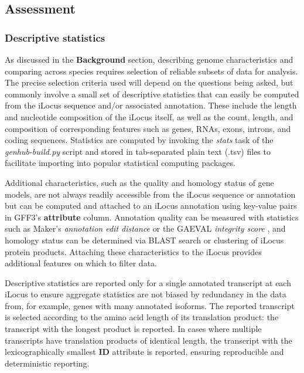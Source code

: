 \subsection*{Assessment}

\subsubsection*{Descriptive statistics}

As discussed in the \textbf{Background} section, describing genome characteristics and comparing across species requires selection of reliable subsets of data for analysis.
The precise selection criteria used will depend on the questions being asked, but commonly involve a small set of descriptive statistics that can easily be computed from the iLocus sequence and/or associated annotation.
These include the length and nucleotide composition of the iLocus itself, as well as the count, length, and composition of corresponding features such as genes, RNAs, exons, introns, and coding sequences.
Statistics are computed by invoking the \textit{stats} task of the \textit{genhub-build.py} script and stored in tab-separated plain text (.tsv) files to facilitate importing into popular statistical computing packages.

Additional characteristics, such as the quality and homology status of gene models, are not always readily accessible from the iLocus sequence or annotation but can be computed and attached to an iLocus annotation using key-value pairs in GFF3's \textbf{attribute} column.
Annotation quality can be measured with statistics such as Maker's \textit{annotation edit distance} \cite{AED} or the GAEVAL \textit{integrity score} \cite{GAEVAL}, and  homology status can be determined via BLAST search or clustering of iLocus protein products.
Attaching these characteristics to the iLocus provides additional features on which to filter data.

Descriptive statistics are reported only for a single annotated transcript at each iLocus to ensure aggregate statistics are not biased by redundancy in the data from, for example, genes with many annotated isoforms.
The reported transcript is selected according to the amino acid length of its translation product: the transcript with the longest product is reported.
In cases where multiple transcripts have translation products of identical length, the transcript with the lexicographically smallest \textbf{ID} attribute is reported, ensuring reproducible and deterministic reporting.

